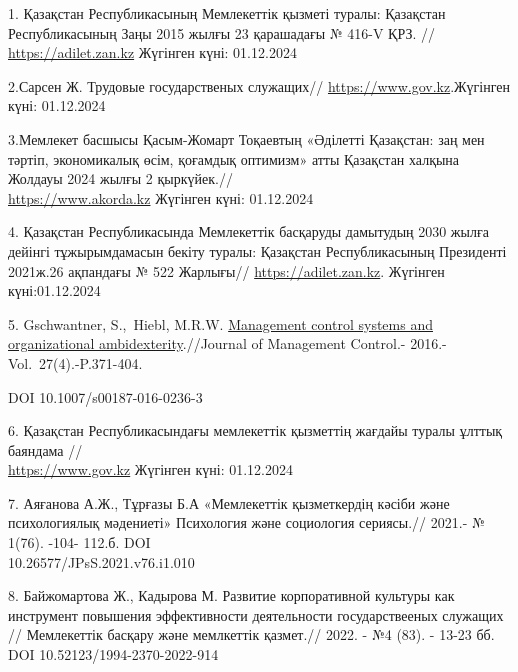 \begin{references}
1. Қазақстан Республикасының Мемлекеттік қызметі туралы: Қазақстан
Республикасының Заңы 2015 жылғы 23 қарашадағы № 416-V ҚРЗ. //
\href{https://adilet.zan.kz/kaz/docs/Z1500000416}{https://adilet.zan.kz} Жүгінген күні:
01.12.2024

2.Сарсен Ж. Трудовые государственых
служащих// \href{https://www.gov.kz/memleket/entities/zem-shahtinsk/press/news/details/813166}{https://www.gov.kz}.Жүгінген күні: 01.12.2024

3.Мемлекет басшысы Қасым-Жомарт Тоқаевтың «Әділетті Қазақстан: заң мен
тәртіп, экономикалық өсім, қоғамдық оптимизм» атты Қазақстан халқына
Жолдауы 2024 жылғы 2
қыркүйек.// \\\href{https://www.akorda.kz/kz/memleket-basshysy-kasym-zhomart-tokaevtyn-adiletti-kazakstan-zan-men-tartip-ekonomikalyk-osim-kogamdyk-optimizm-atty-kazakstan-halkyna-zholdauy-285659}{https://www.akorda.kz}
Жүгінген күні: 01.12.2024

4. Қазақстан Республикасында Мемлекеттік басқаруды дамытудың 2030 жылға
дейінгі тұжырымдамасын бекіту туралы: Қазақстан Республикасының
Президенті 2021ж.26 ақпандағы № 522
Жарлығы// \href{https://adilet.zan.kz/kaz/docs/U150000015}{https://adilet.zan.kz}. Жүгінген
күні:01.12.2024

5. Gschwantner, S.,~Hiebl, M.R.W.
\href{https://www.scopus.com/record/display.uri?eid=2-s2.0-84978811157&origin=reflist&sort=plf-f&src=s&sid=9294c12779ee47479a1a0997e8991897&sot=b&sdt=b&sl=99&s=TITLE\%28An+Examination+of+Civil+Servants\%e2\%80\%99+Assessment+of++the+New+Civil+Service+Reforms+in+Kazakhstan\%29}{Management
control systems and organizational ambidexterity}.//Journal of
Management Control.- 2016.- Vol.~27(4).-P.371-404.~

DOI 10.1007/s00187-016-0236-3

6. Қазақстан Республикасындағы мемлекеттік қызметтің жағдайы туралы
ұлттық баяндама
// \\\href{https://www.gov.kz/memleket/entities/qyzmet/documents/details/454043?lang=kk}{https://www.gov.kz}
Жүгінген күні: 01.12.2024

7. Аяғанова А.Ж., Тұрғазы Б.А «Мемлекеттік қызметкердің кәсіби және
психологиялық мәдениеті» Психология және социология сериясы.// 2021.- №
1(76). -104- 112.б. DOI \\10.26577/JPsS.2021.v76.i1.010

8. Байжомартова Ж., Кадырова М. Развитие корпоративной культуры как
инструмент повышения эффективности деятельности государствееных служащих
// Мемлекеттік басқару және мемлкеттік қазмет.// 2022. - №4 (83). -
13-23 бб. DOI 10.52123/1994-2370-2022-914


\end{references}
